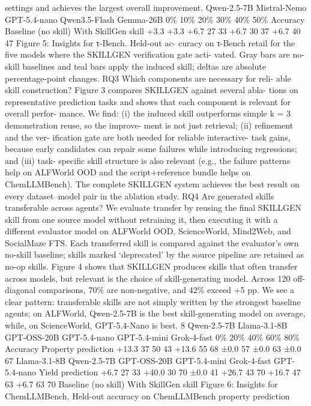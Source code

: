 settings and achieves the largest overall improvement.
Qwen-2.5-7B
Mistral-Nemo
GPT-5.4-nano
Qwen3.5-Flash
Gemma-26B
0\%
10\%
20\%
30\%
40\%
50\%
Accuracy
Baseline (no skill)
With SkillGen skill
+3.3
+3.3
+6.7
27
33
+6.7
30
37
+6.7
40
47
Figure 5: Insights for τ-Bench. Held-out ac-
curacy on τ-Bench retail for the five models
where the SKILLGEN verification gate acti-
vated. Gray bars are no-skill baselines and
teal bars apply the induced skill; deltas are
absolute percentage-point changes.
RQ3 Which components are necessary for reli-
able skill construction?
Figure 3 compares SKILLGEN against several abla-
tions on representative prediction tasks and shows
that each component is relevant for overall perfor-
mance. We find: (i) the induced skill outperforms
simple k = 3 demonstration reuse, so the improve-
ment is not just retrieval; (ii) refinement and the ver-
ification gate are both needed for reliable interactive-
task gains, because early candidates can repair some
failures while introducing regressions; and (iii) task-
specific skill structure is also relevant (e.g., the
failure patterns help on ALFWorld OOD and the
script+reference bundle helps on ChemLLMBench).
The complete SKILLGEN system achieves the best
result on every dataset–model pair in the ablation study.
RQ4 Are generated skills transferable across agents?
We evaluate transfer by reusing the final SKILLGEN skill from one source model without retraining it,
then executing it with a different evaluator model on ALFWorld OOD, ScienceWorld, Mind2Web,
and SocialMaze FTS. Each transferred skill is compared against the evaluator’s own no-skill
baseline; skills marked ‘deprecated’ by the source pipeline are retained as no-op skills. Figure 4
shows that SKILLGEN produces skills that often transfer across models, but relevant is the choice
of skill-generating model. Across 120 off-diagonal comparisons, 70\% are non-negative, and 42\%
exceed +5 pp. We see a clear pattern: transferable skills are not simply written by the strongest
baseline agents; on ALFWorld, Qwen-2.5-7B is the best skill-generating model on average, while,
on ScienceWorld, GPT-5.4-Nano is best.
8
Qwen-2.5-7B
Llama-3.1-8B
GPT-OSS-20B
GPT-5.4-nano
GPT-5.4-mini
Grok-4-fast
0\%
20\%
40\%
60\%
80\%
Accuracy
Property prediction
+13.3
37
50
43
+13.6
55
68
±0.0
57
±0.0
63
±0.0
67
Llama-3.1-8B
Qwen-2.5-7B
GPT-OSS-20B
GPT-5.4-mini
Grok-4-fast
GPT-5.4-nano
Yield prediction
+6.7
27
33
+40.0
30
70
±0.0
41
+26.7
43
70
+16.7
47
63
+6.7
63
70
Baseline (no skill)
With SkillGen skill
Figure 6: Insights for ChemLLMBench. Held-out accuracy on ChemLLMBench property prediction
